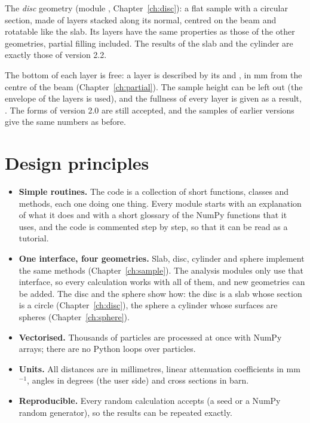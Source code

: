 \begin{note}
The \emph{disc} geometry (module , Chapter~\ref{ch:disc}): a flat sample with a circular section, made of layers stacked
along its normal, centred on the beam and rotatable like the slab. Its layers have the same properties as those of the other
geometries, partial filling included. The results of the slab and the cylinder are exactly those of version 2.2.
\end{note}

\begin{note}
The bottom of each layer is free: a layer is described by its  and , in mm from the centre
of the beam (Chapter~\ref{ch:partial}). The sample height can be left out (the envelope of the layers is used), and
the fullness of every layer is given as a result, . The forms of version 2.0 are still
accepted, and the samples of earlier versions give the same numbers as before.
\end{note}

\section{Design principles}

\begin{itemize}
  \item \textbf{Simple routines.} The code is a collection of short functions, classes and methods,
        each one doing one thing. Every module starts with an explanation of what it does and with a
        short glossary of the NumPy functions that it uses, and the code is commented step by step,
        so that it can be read as a tutorial.
  \item \textbf{One interface, four geometries.} Slab, disc, cylinder and sphere implement the same methods
        (Chapter~\ref{ch:sample}). The analysis modules only use that interface, so every
        calculation works with all of them, and new geometries can be added. The disc and the sphere show how: the
        disc is a slab whose section is a circle (Chapter~\ref{ch:disc}), the sphere a cylinder whose surfaces are
        spheres (Chapter~\ref{ch:sphere}).
  \item \textbf{Vectorised.} Thousands of particles are processed at once with NumPy arrays; there
        are no Python loops over particles.
  \item \textbf{Units.} All distances are in millimetres, linear attenuation coefficients in
        mm$^{-1}$, angles in degrees (the user side) and cross sections in barn.
  \item \textbf{Reproducible.} Every random calculation accepts  (a seed or a NumPy
        random generator), so the results can be repeated exactly.
\end{itemize}

